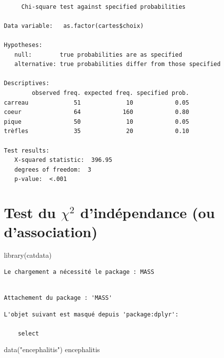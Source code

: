 \documentclass[
  letterpaper,
]{book}
\newenvironment{Shaded}{\begin{snugshade}}{\end{snugshade}}
\newcommand{\FunctionTok}[1]{\textcolor[rgb]{0.28,0.35,0.67}{#1}}
\newcommand{\NormalTok}[1]{\textcolor[rgb]{0.00,0.23,0.31}{#1}}
\newcommand{\StringTok}[1]{\textcolor[rgb]{0.13,0.47,0.30}{#1}}
\begin{document}
\begin{verbatim}

     Chi-square test against specified probabilities

Data variable:   as.factor(cartes$choix) 

Hypotheses: 
   null:        true probabilities are as specified
   alternative: true probabilities differ from those specified

Descriptives: 
        observed freq. expected freq. specified prob.
carreau             51             10            0.05
coeur               64            160            0.80
pique               50             10            0.05
trèfles             35             20            0.10

Test results: 
   X-squared statistic:  396.95 
   degrees of freedom:  3 
   p-value:  <.001 
\end{verbatim}

\section{\texorpdfstring{Test du \(\chi^2\) d'indépendance (ou
d'association)}{Test du \textbackslash chi\^{}2 d'indépendance (ou d'association)}}\label{test-du-chi2-dinduxe9pendance-ou-dassociation}

\begin{Shaded}
\begin{Highlighting}[]
\FunctionTok{library}\NormalTok{(catdata)}
\end{Highlighting}
\end{Shaded}

\begin{verbatim}
Le chargement a nécessité le package : MASS
\end{verbatim}

\begin{verbatim}

Attachement du package : 'MASS'
\end{verbatim}

\begin{verbatim}
L'objet suivant est masqué depuis 'package:dplyr':

    select
\end{verbatim}

\begin{Shaded}
\begin{Highlighting}[]
\FunctionTok{data}\NormalTok{(}\StringTok{"encephalitis"}\NormalTok{)}
\NormalTok{encephalitis}
\end{Highlighting}
\end{Shaded}
\end{document}
